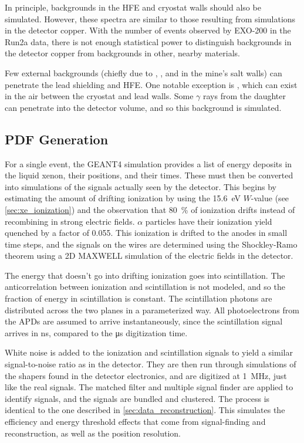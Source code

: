 \documentclass[herrin-thesis.tex]{subfiles}
\begin{document}
In principle, backgrounds in the HFE and cryostat walls should also be simulated. However, these spectra are similar to those resulting from simulations in the detector copper. With the number of events observed by EXO-200 in the Run2a data, there is not enough statistical power to distinguish backgrounds in the detector copper from backgrounds in other, nearby materials.

Few external backgrounds (chiefly due to , , and  in the mine's salt walls) can penetrate the lead shielding and HFE. One notable exception is , which can exist in the air between the cryostat and lead walls. Some \(\gamma\) rays from the  daughter can penetrate into the detector volume, and so this background is simulated.

\subsection{PDF Generation}
For a single event, the GEANT4 simulation provides a list of energy deposits in the liquid xenon, their positions, and their times. These must then be converted into simulations of the signals actually seen by the detector. This begins by estimating the amount of drifting ionization by using the \SI{15.6}{\eV} \(W\)-value (see \cref{sec:xe_ionization}) and the observation that \about{}\SI{80}{\percent} of ionization drifts instead of recombining in strong electric fields\cite{Aprile:1991fk}. \(\alpha\) particles have their ionization yield quenched by a factor of 0.055\cite{Aprile:1991uq}. This ionization is drifted to the anodes in small time steps, and the signals on the wires are determined using the Shockley-Ramo theorem using a 2D MAXWELL simulation of the electric fields in the detector.

The energy that doesn't go into drifting ionization goes into scintillation. The anticorrelation between ionization and scintillation is not modeled, and so the fraction of energy in scintillation is constant. The scintillation photons are distributed across the two planes in a parameterized way. All photoelectrons from the APDs are assumed to arrive instantaneously, since the scintillation signal arrives in \si{\ns}, compared to the \si{\micro\s} digitization time.

White noise is added to the ionization and scintillation signals to yield a similar signal-to-noise ratio as in the detector. They are then run through simulations of the shapers found in the detector electronics, and are digitized at \SI{1}{\MHz}, just like the real signals. The matched filter and multiple signal finder are applied to identify signals, and the signals are bundled and clustered. The process is identical to the one described in \cref{sec:data_reconstruction}. This simulates the efficiency and energy threshold effects that come from signal-finding and reconstruction, as well as the position resolution.
\end{document}
